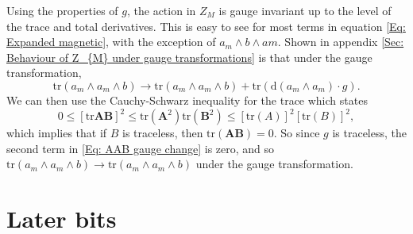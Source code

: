 \documentclass{article}
\begin{document}
\noindent Using the properties of $g$, the action in $Z_{M}$ is gauge invariant up to the level of the trace and total derivatives. This is easy to see for most terms in equation \eqref{Eq: Expanded magnetic}, with the exception of $a_{m}\wedge b \wedge a{m}$. Shown in appendix \ref{Sec: Behaviour of Z_{M} under gauge transformations} is that under the gauge transformation, 
\begin{equation}
    \label{Eq: AAB gauge change}
    \text{tr}\left(a_{m}\wedge a_{m}\wedge b\right)\rightarrow \text{tr}\left(a_{m}\wedge a_{m}\wedge b\right) + \text{tr}\left(\mathrm{d}\left(a_{m}\wedge a_{m}\right)\cdot g\right).
\end{equation}
We can then use the Cauchy-Schwarz inequality for the trace which states
\begin{equation}
    0\leq \left[\text{tr}\mathbf{AB}\right]^{2}\leq \text{tr}\left(\mathbf{A}^{2}\right)\text{tr}\left(\mathbf{B}^{2}\right)\leq \left[\text{tr}\left(A\right)\right]^{2}\left[\text{tr}\left(B\right)\right]^{2},
\end{equation}
which implies that if $B$ is traceless, then $\text{tr}\left(\mathbf{AB}\right)=0$. So since $g$ is traceless, the second term in \eqref{Eq: AAB gauge change} is zero, and so $\text{tr}\left(a_{m}\wedge a_{m}\wedge b\right)\rightarrow \text{tr}\left(a_{m}\wedge a_{m}\wedge b\right)$ under the gauge transformation.


\section{Later bits}





\appendix
\newpage
\end{document}
